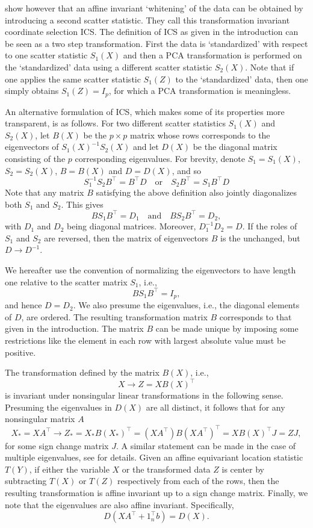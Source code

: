 \documentclass[article,nojss]{jss}
\begin{document}
\citet{Tyler2008} show however that an affine invariant `whitening' of the data can be obtained by introducing a second
scatter statistic. They call this transformation invariant coordinate selection {ICS}. The definition of {ICS} as
given in the introduction can be seen as a two step transformation. First the data is `standardized' with respect to one scatter
statistic $S_1(X)$ and then a {PCA} transformation is performed on the `standardized' data using a different scatter
statistic $S_2(X)$. Note that if one applies the same scatter statistic $S_1(Z)$ to the `standardized' data, then one
simply obtains $S_1(Z) = I_p$, for which a {PCA} transformation is meaningless.

An alternative formulation of {ICS}, which makes some of its properties more transparent, is as follows. For two
different scatter statistics $S_1(X)$ and $S_2(X)$, let $B(X)$ be the $p \times p$ matrix whose rows corresponds to the
eigenvectors of $S_1(X)^{-1}S_2(X)$ and let $D(X)$ be the diagonal matrix consisting of the $p$ corresponding
eigenvalues.  For brevity, denote $S_1=S_1(X)$, $S_2=S_2(X)$, $B=B(X)$ and $D=D(X)$, and so
\[
S_1^{-1}S_2B^\top = B^\top D \quad \mbox{or} \quad S_2B^\top =S_1B^\top D
\]
Note that any matrix $B$ satisfying the above definition also jointly diagonalizes both $S_1$ and $S_2$. This gives
\[ BS_1B^\top = D_1 \quad \mbox{and} \quad BS_2B^\top = D_2, \]
with $D_1$ and $D_2$ being diagonal matrices.  Moreover, $D_1^{-1}D_2 = D$. If the roles of $S_1$ and $S_2$ are reversed,
then the matrix of eigenvectors $B$ is the unchanged, but $D \rightarrow D^{-1}$.

We hereafter use the convention of normalizing the eigenvectors to have length one relative to the scatter
matrix $S_1$, i.e.,
\[ BS_1B^\top = I_p, \]
and hence $D=D_2$. We also presume the eigenvalues, i.e., the diagonal elements of $D$, are ordered. The resulting transformation
matrix $B$ corresponds to that given in the introduction. The matrix $B$ can be made unique by imposing some
restrictions like the element in each row with largest absolute value must be positive.

The transformation defined by the matrix $B(X)$, i.e.,
\[
X \rightarrow Z=XB(X)^\top
\]
is invariant under nonsingular linear transformations in the following sense. Presuming the eigenvalues in $D(X)$ are all distinct,
it follows that for any nonsingular matrix $A$
\[
X_* = XA^\top \rightarrow Z_*= X_*B(X_*)^\top = (XA^\top)B(XA^\top)^\top = XB(X)^\top J = ZJ,
\]
for some sign change matrix $J$. A similar statement can be made in the case of multiple eigenvalues, see \citet{Tyler2008}
for details. Given an affine equivariant location statistic $T(Y)$, if either the variable $X$ or the transformed data $Z$
is center by subtracting $T(X)$ or $T(Z)$ respectively from each of the rows, then the resulting transformation is
affine invariant up to a sign change matrix. Finally, we note that the eigenvalues are also affine invariant. Specifically,
\[ D(XA^\top +1_n^\top b) = D(X). \]
\end{document}
